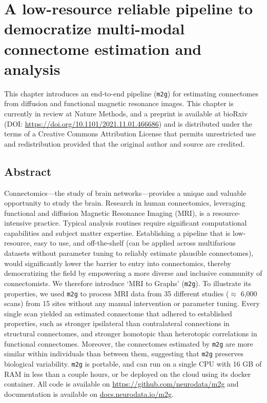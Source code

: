\chapter[MRI to Connectomes]{A low-resource reliable pipeline to democratize multi-modal connectome estimation and analysis} \label{chap:m2g}

This chapter introduces an end-to-end pipeline (\texttt{m2g}) for estimating connectomes from diffusion and functional magnetic resonance images. This chapter is currently in review at Nature Methods, and a preprint is available at bioRxiv (DOI: \url{https://doi.org/10.1101/2021.11.01.466686}) and is distributed under the terms of a Creative Commons Attribution License that permits unrestricted use and redistribution provided that the original author and source are credited.

\pagebreak 
\section*{Abstract}
Connectomics---the study of brain networks---provides a unique and valuable opportunity to study the brain. Research in human connectomics, leveraging functional and diffusion Magnetic Resonance Imaging (MRI), is a resource-intensive practice. Typical analysis routines require significant computational capabilities and subject matter expertise. Establishing a pipeline that is low-resource, easy to use, and off-the-shelf  (can be applied across multifarious datasets without parameter tuning to reliably estimate plausible connectomes), would significantly lower the barrier to entry into connectomics, thereby democratizing the field by empowering a more diverse and inclusive community of connectomists. We therefore introduce `MRI to Graphs' (\texttt{m2g}). To illustrate its properties, we used \texttt{m2g} to process MRI data from 35 different studies ($\approx$ 6,000 scans) from 15 sites without any manual intervention or parameter tuning. Every single scan yielded an estimated connectome that adhered to established properties, such as  stronger ipsilateral than contralateral connections in structural connectomes, and stronger homotopic than heterotopic correlations in functional connectomes. Moreover, the connectomes estimated by \texttt{m2g} are more similar within individuals than between them, suggesting that \texttt{m2g} preserves biological variability. \texttt{m2g} is portable, and can run on a single CPU with 16 GB of RAM in less than a couple hours, or be deployed on the cloud using its docker container. All code is available on \url{https://github.com/neurodata/m2g} and documentation is available on \url{docs.neurodata.io/m2g}.
\pagebreak

